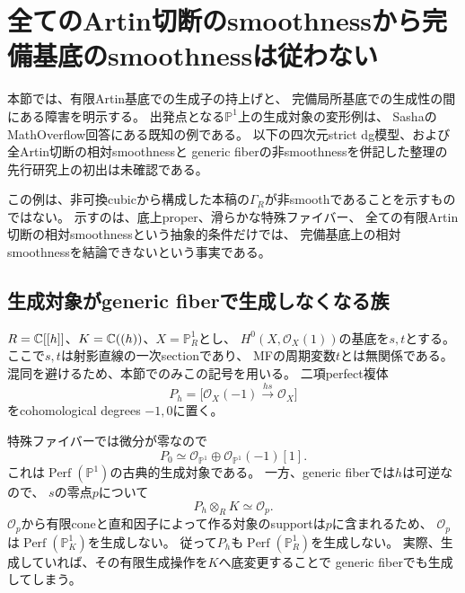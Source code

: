 \section{全てのArtin切断のsmoothnessから完備基底のsmoothnessは従わない}
\label{as:sec:obstruction}

本節では、有限Artin基底での生成子の持上げと、
完備局所基底での生成性の間にある障害を明示する。
出発点となる$\mathbb P^1$上の生成対象の変形例は、
SashaのMathOverflow回答\cite{AMSasha}にある既知の例である。
以下の四次元strict dg模型、および全Artin切断の相対smoothnessと
generic fiberの非smoothnessを併記した整理の先行研究上の初出は未確認である。

この例は、非可換cubicから構成した本稿の$\Gamma_R$が非smoothであることを示すものではない。
示すのは、底上proper、滑らかな特殊ファイバー、
全ての有限Artin切断の相対smoothnessという抽象的条件だけでは、
完備基底上の相対smoothnessを結論できないという事実である。

\subsection{生成対象がgeneric fiberで生成しなくなる族}

$R=\mathbb C[[h]]$、$K=\mathbb C((h))$、$X=\mathbb P^1_R$とし、
$H^0(X,\mathcal O_X(1))$の基底を$s,t$とする。
ここで$s,t$は射影直線の一次sectionであり、
MFの周期変数$t$とは無関係である。
混同を避けるため、本節でのみこの記号を用いる。
二項perfect複体
\begin{equation}\label{as:eq:P}
 P_h=\bigl[\mathcal O_X(-1)\xrightarrow{\,hs\,}\mathcal O_X\bigr]
\end{equation}
をcohomological degrees $-1,0$に置く。

特殊ファイバーでは微分が零なので
\[
 P_0\simeq\mathcal O_{\mathbb P^1}\oplus
                  \mathcal O_{\mathbb P^1}(-1)[1].
\]
これは$\operatorname{Perf}(\mathbb P^1)$の古典的生成対象である。
一方、generic fiberでは$h$は可逆なので、
$s$の零点$p$について
\[
 P_h\otimes_R K\simeq\mathcal O_p.
\]
$\mathcal O_p$から有限coneと直和因子によって作る対象のsupportは$p$に含まれるため、
$\mathcal O_p$は$\operatorname{Perf}(\mathbb P^1_K)$を生成しない。
従って$P_h$も$\operatorname{Perf}(\mathbb P^1_R)$を生成しない。
実際、生成していれば、その有限生成操作を$K$へ底変更することで
generic fiberでも生成してしまう。

